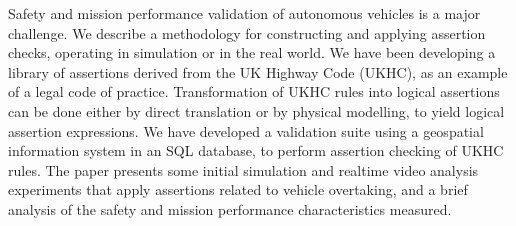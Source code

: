 Safety and mission performance validation of autonomous vehicles is a major challenge. We describe a methodology for constructing and applying assertion checks, operating in simulation or in the real world. We have been developing a library of assertions derived from the UK Highway Code (UKHC), as an example of a legal code of practice. Transformation of UKHC rules into logical assertions can be done either by direct translation or by physical modelling, to yield logical assertion expressions. We have developed a validation suite using a geospatial information system in an SQL database, to perform assertion checking of UKHC rules. 
%
The paper presents some initial simulation and realtime video analysis experiments that apply assertions related to vehicle overtaking, and a brief analysis of the safety and mission performance characteristics measured.
